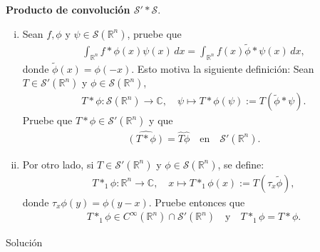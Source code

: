 \begin{homeworkProblem}
  \textbf{Producto de convolución $\mathcal{S}'*\mathcal{S}$}.
  \begin{enumerate}[(i)]
    \item Sean $f, \phi$ y $\psi \in \mathcal{S}(\mathbb{R}^{n})$, pruebe que
      \begin{align*}
        \int_{\mathbb{R}^{n}} f * \phi(x) \psi(x) \, dx = \int_{\mathbb{R}^{n}} f(x) \tilde{\phi} * \psi(x) \, dx,
      \end{align*}
      donde $\tilde{\phi}(x) = \phi(-x)$. Esto motiva la siguiente definición: Sean $T \in \mathcal{S}'(\mathbb{R}^{n})$ y $\phi \in \mathcal{S}(\mathbb{R}^{n})$,
      \begin{align*}
        T * \phi : \mathcal{S}(\mathbb{R}^{n}) \longrightarrow \mathbb{C}, \quad \psi \longmapsto T * \phi(\psi) := T(\tilde{\phi} * \psi).
      \end{align*}
      Pruebe que $T * \phi \in \mathcal{S}'(\mathbb{R}^{n})$ y que
      \begin{align*}
        \hat{(T * \phi)} = \hat{T} \hat{\phi} \quad \text{en} \quad \mathcal{S}'(\mathbb{R}^{n}).
      \end{align*}
    \item Por otro lado, si $T \in \mathcal{S}'(\mathbb{R}^{n})$ y $\phi \in \mathcal{S}(\mathbb{R}^{n})$, se define:
      \begin{align*}
        T *_1 \phi : \mathbb{R}^{n} \longrightarrow \mathbb{C}, \quad x \longmapsto T *_1 \phi(x) := T(\tau_x \tilde{\phi}),
      \end{align*}
      donde $\tau_x \phi(y) = \phi(y - x)$. Pruebe entonces que
      \begin{align*}
        T *_1 \phi \in C^\infty(\mathbb{R}^{n}) \cap \mathcal{S}'(\mathbb{R}^{n}) \quad \text{y} \quad T *_1 \phi = T * \phi.
      \end{align*}
  \end{enumerate}
  \begin{solution}
    Solución
  \end{solution}
\end{homeworkProblem}
